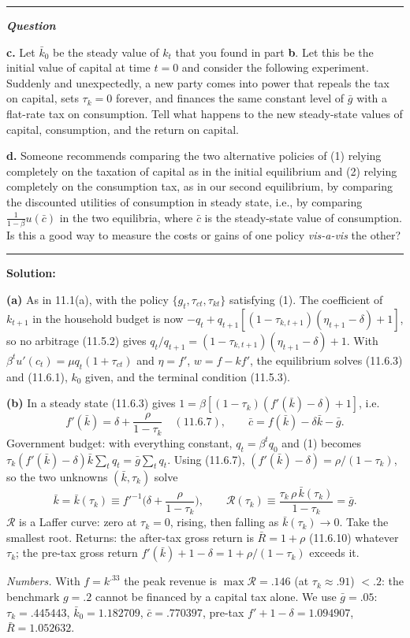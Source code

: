 \documentclass[12pt, letterpaper]{article}
\newenvironment{longquestion}{\par\small\noindent\textcolor{gray!60}{\rule{\linewidth}{0.4pt}}\par\nobreak
  \noindent\textcolor{gray!60!black}{\bfseries\textit{Question}}\par\nobreak}{\par\noindent
  \textcolor{gray!60}{\rule{\linewidth}{0.4pt}}\par}
\newcommand{\Rb}{\bar R}
\newcommand{\kb}{\bar k}
\newcommand{\cb}{\bar c}
\newcommand{\gb}{\bar g}
\begin{document}
\begin{tcolorbox}[evenbox,title={Exercise 11.2 \quad Tax reform: II}]
\begin{longquestion}
\textbf{c.} Let $\bar k_0$ be the steady value of $k_t$ that you found in part \textbf{b}. Let this be the initial value of
capital at time $t=0$ and consider the following experiment. Suddenly and unexpectedly, a new party comes into power that
repeals the tax on capital, sets $\tau_k=0$ forever, and finances the same constant level of $\bar g$ with a flat-rate tax
on consumption. Tell what happens to the new steady-state values of capital, consumption, and the return on capital.

\textbf{d.} Someone recommends comparing the two alternative policies of (1) relying completely on the taxation of capital
as in the initial equilibrium and (2) relying completely on the consumption tax, as in our second equilibrium, by
comparing the discounted utilities of consumption in steady state, i.e., by comparing $\frac1{1-\beta}u(\bar c)$ in the
two equilibria, where $\bar c$ is the steady-state value of consumption. Is this a good way to measure the costs or gains
of one policy \emph{vis-a-vis} the other?
\end{longquestion}

\textbf{Solution:}

\textbf{(a)} As in 11.1(a), with the policy $\{g_t,\tau_{ct},\tau_{kt}\}$ satisfying (1). The coefficient of $k_{t+1}$ in the
household budget is now $-q_t+q_{t+1}[(1-\tau_{k,t+1})(\eta_{t+1}-\delta)+1]$, so no arbitrage (11.5.2) gives
$q_t/q_{t+1}=(1-\tau_{k,t+1})(\eta_{t+1}-\delta)+1$. With $\beta^tu'(c_t)=\mu q_t(1+\tau_{ct})$ and $\eta=f'$, $w=f-kf'$, the
equilibrium solves (11.6.3) and (11.6.1), $k_0$ given, and the terminal condition (11.5.3).

\textbf{(b)} In a steady state (11.6.3) gives $1=\beta[(1-\tau_k)(f'(\kb)-\delta)+1]$, i.e.
\[
f'(\kb)=\delta+\frac{\rho}{1-\tau_k}\quad(11.6.7),\qquad \cb=f(\kb)-\delta\kb-\gb .
\]
Government budget: with everything constant, $q_t=\beta^tq_0$ and (1) becomes
$\tau_k(f'(\kb)-\delta)\kb\sum_tq_t=\gb\sum_tq_t$. Using (11.6.7), $(f'(\kb)-\delta)=\rho/(1-\tau_k)$, so the two unknowns
$(\kb,\tau_k)$ solve
\[
\kb=\kb(\tau_k)\equiv f'^{-1}\!\Big(\delta+\frac{\rho}{1-\tau_k}\Big),\qquad
\mathcal R(\tau_k)\equiv\frac{\tau_k\,\rho\,\kb(\tau_k)}{1-\tau_k}=\gb .
\]
$\mathcal R$ is a Laffer curve: zero at $\tau_k=0$, rising, then falling as $\kb(\tau_k)\to0$. Take the smallest root.
Returns: the after-tax gross return is $\Rb=1+\rho$ (11.6.10) whatever $\tau_k$; the pre-tax gross return
$f'(\kb)+1-\delta=1+\rho/(1-\tau_k)$ exceeds it.

\emph{Numbers.} With $f=k^{.33}$ the peak revenue is $\max\mathcal R=.146$ (at $\tau_k\approx.91$) $<.2$: the benchmark
$g=.2$ cannot be financed by a capital tax alone. We use $\gb=.05$: $\tau_k=.445443$, $\kb_0=1.182709$, $\cb=.770397$,
pre-tax $f'+1-\delta=1.094907$, $\Rb=1.052632$.


\end{tcolorbox}
\end{document}
